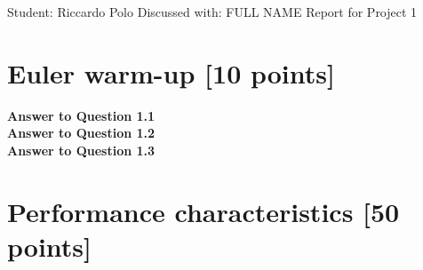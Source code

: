 \documentclass[unicode,10pt,a4paper,oneside,numbers=endperiod,openany]{scrartcl}
\begin{document}
\setassignment
{}

            {Student: Riccardo Polo}
            {Discussed with: FULL NAME}
            {Report for Project 1}{}
\newline

\assignmentpolicy

\newpage
\section{Euler warm-up [10 points]}
\textbf{Answer to Question 1.1} \\

\textbf{Answer to Question 1.2} \\

\textbf{Answer to Question 1.3} \\

\newpage
\section{Performance characteristics [50 points]}


\end{document}
